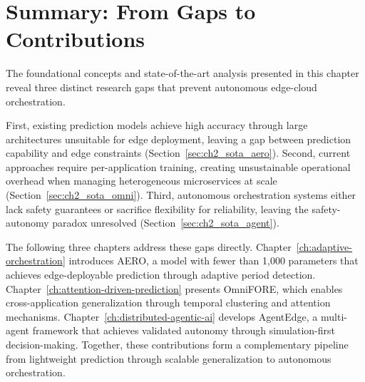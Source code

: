 



\section{Summary: From Gaps to Contributions}
\label{sec:ch2_summary}

The foundational concepts and state-of-the-art analysis presented in this chapter reveal three distinct research gaps that prevent autonomous edge-cloud orchestration.

First, existing prediction models achieve high accuracy through large architectures unsuitable for edge deployment, leaving a gap between prediction capability and edge constraints (Section~\ref{sec:ch2_sota_aero}). Second, current approaches require per-application training, creating unsustainable operational overhead when managing heterogeneous microservices at scale (Section~\ref{sec:ch2_sota_omni}). Third, autonomous orchestration systems either lack safety guarantees or sacrifice flexibility for reliability, leaving the safety-autonomy paradox unresolved (Section~\ref{sec:ch2_sota_agent}).

The following three chapters address these gaps directly. Chapter~\ref{ch:adaptive-orchestration} introduces \ac{AERO}, a model with fewer than 1,000 parameters that achieves edge-deployable prediction through adaptive period detection. Chapter~\ref{ch:attention-driven-prediction} presents \ac{OmniFORE}, which enables cross-application generalization through temporal clustering and attention mechanisms. Chapter~\ref{ch:distributed-agentic-ai} develops \ac{AgentEdge}, a multi-agent framework that achieves validated autonomy through simulation-first decision-making. Together, these contributions form a complementary pipeline from lightweight prediction through scalable generalization to autonomous orchestration.
